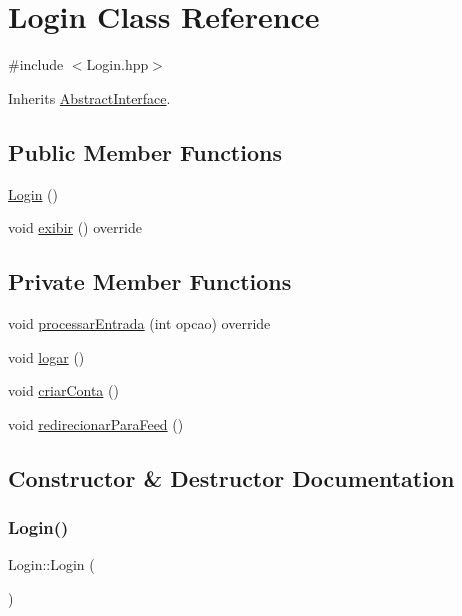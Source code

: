 \hypertarget{class_login}{}\section{Login Class Reference}
\label{class_login}


{\ttfamily \#include $<$Login.\+hpp$>$}



Inherits \hyperlink{class_abstract_interface}{Abstract\+Interface}.

\subsection*{Public Member Functions}
\begin{DoxyCompactItemize}
\item 
\hyperlink{class_login_a4847f3e07e43b540d3339392346f87ff}{Login} ()
\item 
void \hyperlink{class_login_a9396a20329d6ef8ef14bc84bb4f09f92}{exibir} () override
\end{DoxyCompactItemize}
\subsection*{Private Member Functions}
\begin{DoxyCompactItemize}
\item 
void \hyperlink{class_login_ad32313d37b2ca70d7f8057c04ec12b0e}{processar\+Entrada} (int opcao) override
\item 
void \hyperlink{class_login_aae4aa1e5c777d6f42f695edd6332da96}{logar} ()
\item 
void \hyperlink{class_login_a31b7c1449884ccf603f80627a4bb7b78}{criar\+Conta} ()
\item 
void \hyperlink{class_login_a9588b070d2843cd8cf2af475b66bfd1b}{redirecionar\+Para\+Feed} ()
\end{DoxyCompactItemize}


\subsection{Constructor \& Destructor Documentation}
\mbox{\label{class_login_a4847f3e07e43b540d3339392346f87ff}} 
\subsubsection{\texorpdfstring{Login()}{Login()}}
{\footnotesize\ttfamily Login\+::\+Login (\begin{DoxyParamCaption}{ }\end{DoxyParamCaption})}



